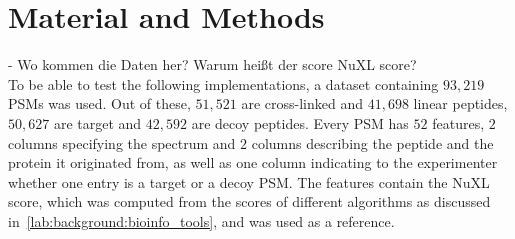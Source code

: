 
\chapter{Material and Methods}
\label{matmet}

- Wo kommen die Daten her? Warum heißt der score NuXL score?\\
\label{lab:matmet:dataset}
To be able to test the following implementations, a dataset containing $93,219$ PSMs was used. Out of these, $51,521$ are cross-linked and $41,698$ linear peptides, $50,627$ are target and $42,592$ are decoy peptides. Every PSM has $52$ features, $2$ columns specifying the spectrum and $2$ columns describing the peptide and the protein it originated from, as well as one column indicating to the experimenter whether one entry is a target or a decoy PSM. The features contain the NuXL score, which was computed from the scores of different algorithms as discussed in~\ref{lab:background:bioinfo_tools}, and was used as a reference.
\renewcommand{\baselinestretch}{0.9}
